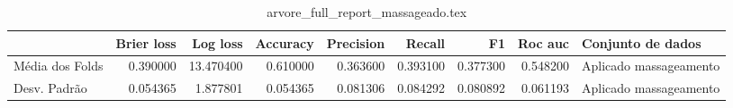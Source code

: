 \begin{table}
\centering
\caption{arvore_full_report_massageado.tex}
\label{arvore_full_report_massageado.tex}
\begin{tabular}{lrrrrrrrl}
\toprule
{} &  Brier  loss &   Log loss &  Accuracy  &  Precision  &   Recall  &       F1  &  Roc auc  &       Conjunto de dados \\
\midrule
Média dos Folds &     0.390000 &  13.470400 &   0.610000 &    0.363600 &  0.393100 &  0.377300 &  0.548200 &  Aplicado massageamento \\
Desv. Padrão    &     0.054365 &   1.877801 &   0.054365 &    0.081306 &  0.084292 &  0.080892 &  0.061193 &  Aplicado massageamento \\
\bottomrule
\end{tabular}
\end{table}
